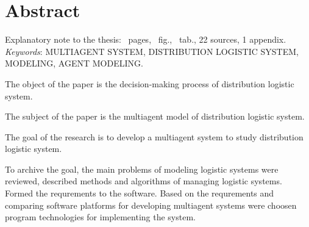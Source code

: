 \section*{Abstract}
Explanatory note to the thesis: \pageref{LastPage}~pages, \totalfigures~fig., \totaltables~tab., 22 sources, 1 appendix. \bigbreak 
\textit{Keywords}: \MakeUppercase{multiagent system, distribution logistic system, modeling, agent modeling}. \bigbreak 

The object of the paper is the decision-making process of distribution logistic system.

The subject of the paper is the multiagent model of  distribution logistic system.

The goal of the research is to develop a multiagent system to study distribution logistic system.

To archive the goal, the main problems of modeling logistic systems were reviewed, described methods and algorithms of managing logistic systems.
Formed the requrements to the software.
Based on the requrements and comparing software platforms for developing multiagent systems were choosen program technologies for implementing the system.  
